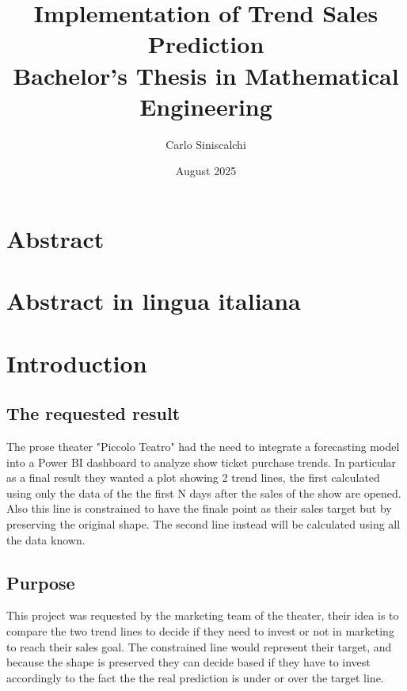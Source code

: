 \documentclass[a4paper,12pt]{report}  %
\title{\textbf{Implementation of Trend Sales Prediction} \\[1ex]
Bachelor's Thesis in Mathematical Engineering}
\author{Carlo Siniscalchi}
\date{August 2025}
\begin{document}
\begin{titlepage}
	\maketitle
	\thispagestyle{empty}      %
\end{titlepage}

\clearpage
\tableofcontents
\thispagestyle{empty}        %

\clearpage

\section*{Abstract}
\clearpage

\section*{Abstract in lingua italiana}
\clearpage


\section{Introduction}
\subsection{The requested result}
The prose theater "Piccolo Teatro" had the need to integrate a forecasting model into a Power BI dashboard to analyze show ticket purchase trends.
In particular as a final result they wanted a plot showing 2 trend lines,
the first calculated using only the data of the the first N days after the sales of the show are opened.
Also this line is constrained to have the finale point as their sales target but by preserving the original shape.
The second line instead will be calculated using all the data known.

\subsection{Purpose}
This project was requested by the marketing team of the theater, their idea is to compare the two trend lines to decide
if they need to invest or not in marketing to reach their sales goal.
The constrained line would represent their target, and because the shape is preserved they can decide based if they have to invest
accordingly to the fact the the real prediction is under or over the target line.
\end{document}
